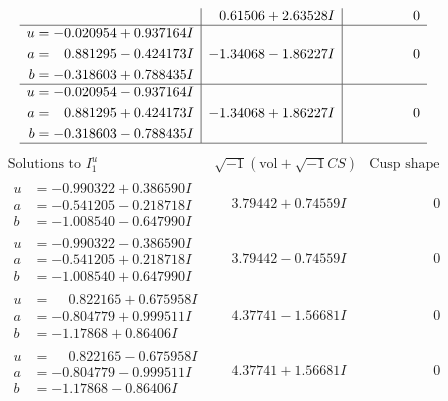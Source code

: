 \documentclass[1p]{elsarticle_modified}
\theoremstyle{definition}
\newcommand{\I}{\sqrt{-1}}
\begin{document}
$$\begin{array}{c|c|c}
 & \phantom{-}0.61506 + 2.63528 I & \phantom{-0.000000 } 0 \\ \hline\begin{aligned}
u &= -0.020954 + 0.937164 I \\
a &= \phantom{-}0.881295 - 0.424173 I \\
b &= -0.318603 + 0.788435 I\end{aligned}
 & -1.34068 - 1.86227 I & \phantom{-0.000000 } 0 \\ \hline\begin{aligned}
u &= -0.020954 - 0.937164 I \\
a &= \phantom{-}0.881295 + 0.424173 I \\
b &= -0.318603 - 0.788435 I\end{aligned}
 & -1.34068 + 1.86227 I & \phantom{-0.000000 } 0\\
 \hline 
 \end{array}$$\newpage$$\begin{array}{c|c|c}  
\text{Solutions to }I^u_{1}& \I (\text{vol} + \sqrt{-1}CS) & \text{Cusp shape}\\
 \hline 
\begin{aligned}
u &= -0.990322 + 0.386590 I \\
a &= -0.541205 - 0.218718 I \\
b &= -1.008540 - 0.647990 I\end{aligned}
 & \phantom{-}3.79442 + 0.74559 I & \phantom{-0.000000 } 0 \\ \hline\begin{aligned}
u &= -0.990322 - 0.386590 I \\
a &= -0.541205 + 0.218718 I \\
b &= -1.008540 + 0.647990 I\end{aligned}
 & \phantom{-}3.79442 - 0.74559 I & \phantom{-0.000000 } 0 \\ \hline\begin{aligned}
u &= \phantom{-}0.822165 + 0.675958 I \\
a &= -0.804779 + 0.999511 I \\
b &= -1.17868 + 0.86406 I\end{aligned}
 & \phantom{-}4.37741 - 1.56681 I & \phantom{-0.000000 } 0 \\ \hline\begin{aligned}
u &= \phantom{-}0.822165 - 0.675958 I \\
a &= -0.804779 - 0.999511 I \\
b &= -1.17868 - 0.86406 I\end{aligned}
 & \phantom{-}4.37741 + 1.56681 I & \phantom{-0.000000 } 0 \\ \hline\begin{aligned}

\end{aligned}
\end{array}$$
\end{document}
